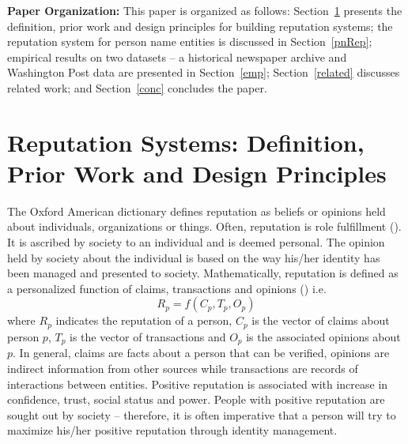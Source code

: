 \documentclass[a4paper,man,natbib]{apa6}
\begin{document}
\noindent \textbf{Paper Organization:} This paper is organized as follows: Section~\ref{repsys} presents the definition, prior work and design principles for building reputation systems; the reputation system for person name entities is discussed in Section~\ref{pnRep}; empirical results on two datasets -- a historical newspaper archive and Washington Post data are presented in Section~\ref{emp};  Section~\ref{related} discusses related work; and Section~\ref{conc} concludes the paper.

\section{Reputation Systems: Definition, Prior Work and Design Principles}
\label{repsys}

\noindent The Oxford American dictionary defines reputation as beliefs or opinions held about individuals, organizations or things. Often, reputation is role fulfillment (\cite{Carter_02}). It is ascribed by society to an individual and is deemed personal. The opinion held by society about the individual is based on the way his/her identity has been managed and presented to society. Mathematically, reputation is defined as a personalized function of claims, transactions and opinions (\cite{Windley_07a}) i.e.
\begin{equation}
R_p = f(C_p, T_p, O_p)
\end{equation}
where $R_p$ indicates the reputation of a person, $C_p$ is the vector of claims about person $p$, $T_p$ is the vector of transactions and $O_p$ is the associated opinions about $p$. In general, claims are facts about a person that can be verified, opinions are indirect information from other sources while transactions are records of interactions between entities.
Positive reputation is associated with increase in confidence, trust, social status and power. People with positive reputation are sought out by society -- therefore, it is often imperative that a person will try to maximize his/her positive reputation through identity management.
\end{document}
